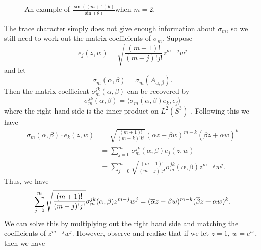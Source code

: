 \documentclass{article}
\begin{document}
\begin{figure}
\begin{center}
    \caption{An example of $\frac{ \sin\left((m+1)\theta\right)}{ \sin\left(\theta\right)}$when $m=2$.}
\end{center}
\end{figure}

The trace character simply does not give enough information about $\sigma_m$, so we still need to work out the matrix coefficients of $\sigma_m$. Suppose 
\begin{equation}
    e_{j}(z,w) = \sqrt{\frac{(m+1)!}{(m-j)!j!}}z^{m-j}w^{j}
\end{equation}
and let 
\begin{equation}
    \sigma_m(\alpha, \beta) = \sigma_m(A_{\alpha,\beta}).
\end{equation}
Then the matrix coefficient $\sigma^{jk}_{m}(\alpha,\beta)$ can be recovered by
\begin{equation}
    \sigma^{jk}_{m}(\alpha,\beta)= \langle \sigma_m(\alpha,\beta)e_k, e_j \rangle
\end{equation}
where the right-hand-side is the inner product on $L^{2}(S^{3})$ . Following this we have
\begin{equation}
    \begin{split}
        \sigma_m(\alpha, \beta)\cdot e_k (z,w) &=
        \sqrt{\frac{(m+1)!}{(m-k)!k!}}(\overline{\alpha}z - \beta w)^{m-k}(\overline{\beta}z+\alpha w)^{k} \\
        &= \sum_{j=0}^{m} \sigma^{jk}_{m}(\alpha,\beta)e_j(z,w) \\
        &= \sum_{j=0}^{m} \sqrt{\frac{(m+1)!}{(m-j)!j!}} \sigma^{jk}_{m}(\alpha,\beta)z^{m-j}w^{j}.
    \end{split}
\end{equation}
Thus, we have
\begin{equation}
        \sum_{j=0}^{m} \sqrt{\frac{(m+1)!}{(m-j)!j!}} \sigma^{jk}_{m}(\alpha,\beta)z^{m-j}w^{j}
        =
        (\overline{\alpha}z - \beta w)^{m-k}(\overline{\beta}z+\alpha w)^{k}. \\
\end{equation}
We can solve this by multiplying out the right hand side and matching the coefficients of $z^{m-j}w^{j}$. However, observe and realise that if we let $z=1$, $w=e^{ix}$, then we have
\end{document}
